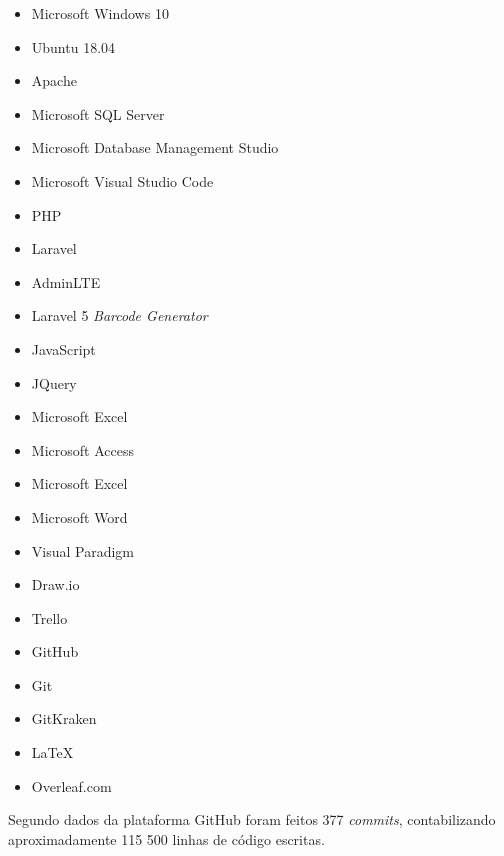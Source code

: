\begin{multicols}{3}
	\begin{itemize}
		\item Microsoft Windows 10
		\item Ubuntu 18.04\cite{Canonical}
		
		\item Apache\cite{Apache}
		\item Microsoft SQL Server\cite{Microsoftb}
		
		\item Microsoft Database Management Studio\cite{Microsoftc}
		\item Microsoft Visual Studio Code
		
		\item PHP\cite{PHP}
		\item Laravel\cite{Laravel}
		\item AdminLTE\cite{AlmsaeedStudio}
		\item Laravel 5 \textit{Barcode Generator}\cite{Milon}
		\item JavaScript
		\item JQuery
		
		\item Microsoft Excel
		\item Microsoft Access
		\item Microsoft Excel
		\item Microsoft Word
		
		\item Visual Paradigm
		\item Draw.io
		
		\item Trello
		\item GitHub
		\item Git
		\item GitKraken
		
		\item \LaTeX
		\item Overleaf.com\cite{Overleaf}
	\end{itemize}
\end{multicols}

Segundo dados da plataforma GitHub foram feitos 377 \textit{commits}, contabilizando aproximadamente 115 500 linhas de código escritas.